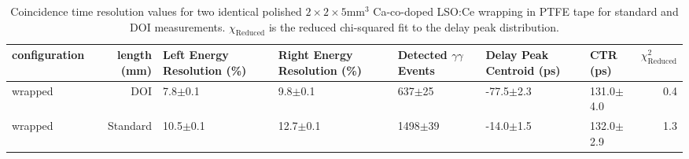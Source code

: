 \begin{table}
\caption{\label{tab:referencevals} Coincidence time resolution values for two identical polished $2\times2\times5$mm$^3$ Ca-co-doped LSO:Ce wrapping in PTFE tape for standard and DOI measurements. $\chi_\text{Reduced}$ is the reduced chi-squared fit to the delay peak distribution.}
\begin{tabular}{lrlllllr}
configuration &  length (mm) & Left Energy Resolution (\%) & Right Energy Resolution (\%) & Detected $\gamma\gamma$ Events & Delay Peak Centroid (ps) & CTR (ps) &  $\chi^2_\text{Reduced}$ \\
\hline
      wrapped &     DOI &   7.8$\pm$0.1 &   9.8$\pm$0.1 &   637$\pm$25 &   -77.5$\pm$2.3 &  131.0$\pm$4.0 &        0.4 \\
      wrapped &   Standard &  10.5$\pm$0.1 &  12.7$\pm$0.1 &  1498$\pm$39 &   -14.0$\pm$1.5 &  132.0$\pm$2.9 &        1.3 \\
\hline
\end{tabular}
\end{table}
